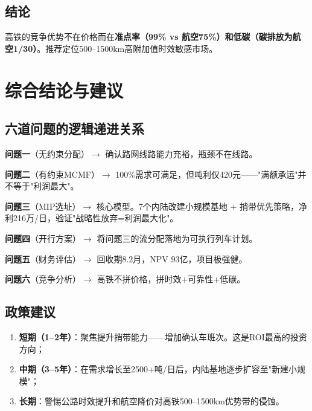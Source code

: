 \documentclass[12pt,a4paper,fontset=none]{ctexart}
\begin{document}
\subsection{结论}
高铁的竞争优势不在价格而在\textbf{准点率（99\% vs 航空75\%）和低碳（碳排放为航空1/30）}。推荐定位500--1500km高附加值时效敏感市场。

\section{综合结论与建议}

\subsection{六道问题的逻辑递进关系}

\textbf{问题一}（无约束分配）$\to$ 确认路网线路能力充裕，瓶颈不在线路。

\textbf{问题二}（有约束MCMF）$\to$ 100\%需求可满足，但吨利仅420元——"满额承运"并不等于"利润最大"。

\textbf{问题三}（MIP选址）$\to$ 核心模型。7个内陆改建小规模基地 + 捎带优先策略，净利216万/日，验证"战略性放弃=利润最大化"。

\textbf{问题四}（开行方案）$\to$ 将问题三的流分配落地为可执行列车计划。

\textbf{问题五}（财务评估）$\to$ 回收期8.2月，NPV 93亿，项目极强健。

\textbf{问题六}（竞争分析）$\to$ 高铁不拼价格，拼时效+可靠性+低碳。

\subsection{政策建议}

\begin{enumerate}[leftmargin=*]
    \item \textbf{短期（1--2年）}：聚焦提升捎带能力——增加确认车班次。这是ROI最高的投资方向；
    \item \textbf{中期（3--5年）}：在需求增长至2500+吨/日后，内陆基地逐步扩容至"新建小规模"；
    \item \textbf{长期}：警惕公路时效提升和航空降价对高铁500--1500km优势带的侵蚀。
\end{enumerate}
\end{document}
